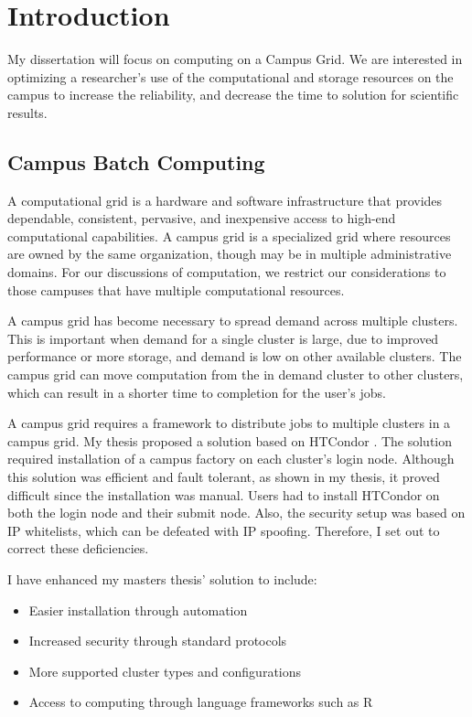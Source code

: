 \chapter{Introduction}

My dissertation will focus on computing on a Campus Grid.  We are interested in optimizing a researcher's use of the computational and storage resources on the campus to increase the reliability, and decrease the time to solution for scientific results.

\section{Campus Batch Computing}

A computational grid is a hardware and software infrastructure that provides dependable, consistent, pervasive, and inexpensive access to high-end computational capabilities\cite{foster2004grid}.  A campus grid is a specialized grid where resources are owned by the same organization, though may be in multiple administrative domains.  For our discussions of computation, we restrict our considerations to those campuses that have multiple computational resources.

A campus grid has become necessary to spread demand across multiple clusters.  This is important when demand for a single cluster is large, due to improved performance or more storage, and demand is low on other available clusters.  The campus grid can move computation from the in demand cluster to other clusters, which can result in a shorter time to completion for the user's jobs.

A campus grid requires a framework to distribute jobs to multiple clusters in a campus grid.  My thesis \cite{weitzel2011campus} proposed a solution based on HTCondor \cite{litzkow1988condor}.  The solution required installation of a campus factory \cite{website:campusfactory} on each cluster's login node.  Although this solution was efficient and fault tolerant, as shown in my thesis, it proved difficult since the installation was manual.  Users had to install HTCondor on both the login node and their submit node.  Also, the security setup was based on IP whitelists, which can be defeated with IP spoofing.  Therefore, I set out to correct these deficiencies.

I have enhanced my masters thesis' solution to include:
\begin{itemize}
\item Easier installation through automation
\item Increased security through standard protocols
\item More supported cluster types and configurations
\item Access to computing through language frameworks such as R \cite{team2005r}
\end{itemize}

